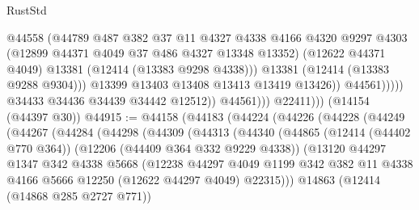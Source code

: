 \begin{lexlean}{RustStd}
\begin{coremodule}
{\begin{coremodule}
{{{{{{{{{{{{{{{{{{{{{{{{{{{{{{{{{{{{{{{{{{{{{{{{{{                                    @44558
                                    (@44789
                                      @487
                                      @382
                                      @37
                                      @11
                                      @4327
                                      @4338
                                      @4166
                                      @4320
                                      @9297
                                      @4303
                                      (@12899 @44371 @4049 @37 @486 @4327 @13348 @13352)
                                      (@12622 @44371 @4049)
                                      @13381
                                      (@12414 (@13383 @9298 @4338)))
                                    @13381
                                    (@12414 (@13383 @9288 @9304)))
                                  @13399
                                  @13403
                                  @13408
                                  @13413
                                  @13419
                                  @13426))
                              @44561)))))
                    @34433
                    @34436
                    @34439
                    @34442
                    @12512))
                @44561)))
          @22411)))
    (@14154 (@44397 @30))
@44915 := @44158
    (@44183
      (@44224
        (@44226
          (@44228
            (@44249
              (@44267
                (@44284
                  (@44298
                    (@44309
                      (@44313
                        (@44340
                          (@44865
                            (@12414 (@44402 @770 @364))
                            (@12206 (@44409 @364 @332 @9229 @4338))
                            (@13120
                              @44297
                              @1347
                              @342
                              @4338
                              @5668
                              (@12238
                                @44297
                                @4049
                                @1199
                                @342
                                @382
                                @11
                                @4338
                                @4166
                                @5666
                                @12250
                                (@12622 @44297 @4049)
                                @22315)))
                          @14863
                          (@12414 (@14868 @285 @2727 @771))
}}}}}}}}}}}}}}}}}}}}}}}}}}}}}}}}}}}}}}}}}}}}}}}}}}
\end{coremodule}}
\end{coremodule}
\end{lexlean}
